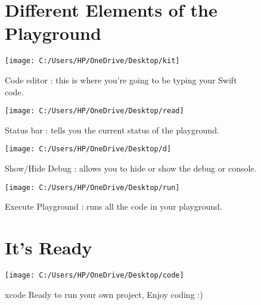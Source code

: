 \documentclass[14pt]{extarticle}
\begin{document}
\begin{figure}
	\section{Different Elements of the Playground}
	\centering
	\texttt{[image: C:/Users/HP/OneDrive/Desktop/kit]}
	\caption{Code editor : this is where you’re going to be typing your Swift code.}
	\label{fig:kit}
\end{figure}
\begin{figure}
	\centering
	\texttt{[image: C:/Users/HP/OneDrive/Desktop/read]}
	\caption{Status bar : tells you the current status of the playground.}
	\label{fig:read}
\end{figure}

\begin{figure}
	\centering
	\texttt{[image: C:/Users/HP/OneDrive/Desktop/d]}
	\caption{Show/Hide Debug : allows you to hide or show the debug or console.}
	\label{fig:d}
\end{figure}

\begin{figure}
	\centering
	\texttt{[image: C:/Users/HP/OneDrive/Desktop/run]}
	\caption{Execute Playground : runs all the code in your playground.}
	\label{fig:run}
\end{figure}

\begin{figure}
	\section{It's Ready}
	\centering
	\texttt{[image: C:/Users/HP/OneDrive/Desktop/code]}
	\caption{xcode Ready to run your own project, Enjoy coding :)}
	\label{fig:code}
\end{figure}
\end{document}
